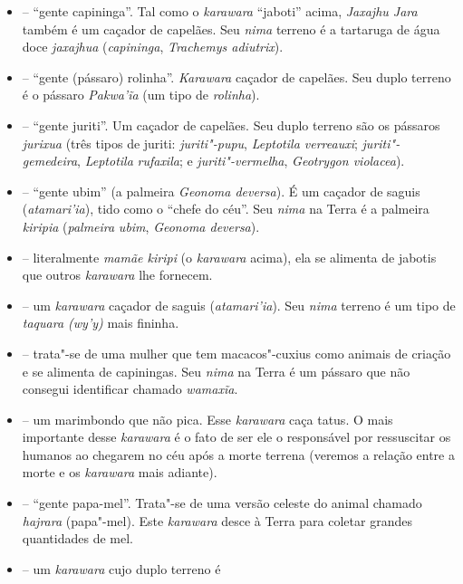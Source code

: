 \begin{itemize}
\item
  \emph{} -- ``gente capininga''. Tal como o \emph{karawara} ``jaboti''
  acima, \emph{Jaxajhu Jara} também é um caçador de capelães.
  Seu \emph{nima} terreno é a tartaruga de água doce \emph{jaxajhua}
  (\emph{capininga}, \emph{Trachemys adiutrix}).
\item
   -- ``gente (pássaro) rolinha''. \emph{Karawara} caçador de
  capelães. Seu duplo terreno é o pássaro \emph{Pakwa'ĩa} (um tipo de
  \emph{rolinha}).
\item
   -- ``gente juriti''. Um caçador de capelães. Seu duplo
  terreno são os pássaros \emph{jurixua} (três tipos de juriti:
  \emph{juriti"-pupu}, \emph{Leptotila verreauxi};
  \emph{juriti"-gemedeira}, \emph{Leptotila} \emph{rufaxila}; e
  \emph{juriti"-vermelha}, \emph{Geotrygon violacea}).
\item
  \emph{} -- ``gente ubim'' (a palmeira \emph{Geonoma deversa}). É um caçador de saguis
  (\emph{atamari'ia}), tido como o ``chefe do céu''. Seu \emph{nima} na
  Terra é a palmeira \emph{kiripia} (\emph{palmeira} \emph{ubim},
  \emph{Geonoma deversa}).
\item
  \emph{} -- literalmente \emph{mamãe kiripi}
  (o \emph{karawara} acima), ela se alimenta de jabotis que outros
  \emph{karawara} lhe fornecem.
\item
  \emph{} -- um \emph{karawara} caçador de saguis
  (\emph{atamari'ia}). Seu \emph{nima} terreno é um tipo de
  \emph{taquara (wy'y)} mais fininha.
\item
  \emph{} -- trata"-se de uma mulher que tem
  macacos"-cuxius como animais de criação e se alimenta de capiningas.
  Seu \emph{nima} na Terra é um pássaro que não consegui identificar
  chamado \emph{wamaxĩa}.
\item
  \emph{} -- um marimbondo que não pica. Esse
  \emph{karawara} caça tatus. O mais importante desse \emph{karawara} é
  o fato de ser ele o responsável por ressuscitar os humanos ao chegarem
  no céu após a morte terrena (veremos a relação entre a morte e os
  \emph{karawara} mais adiante).
\item
  \emph{} -- ``gente papa-mel''. Trata"-se de uma versão celeste do animal
  chamado \emph{hajrara} (papa"-mel). Este \emph{karawara} desce à Terra
  para coletar grandes quantidades de mel.
\item
  \emph{} -- um \emph{karawara} cujo duplo terreno é

\end{itemize}
